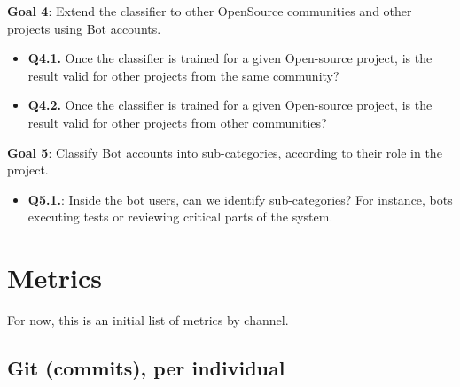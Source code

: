 \documentclass[a4paper, 12pt]{book}
\begin{document}
\textbf{Goal 4}: Extend the classifier to other OpenSource communities and other projects using Bot accounts.

\begin{itemize}
    \item \textbf{Q4.1.} Once the classifier is trained for a given Open-source project, is the result valid for other projects from the same community?
    \item \textbf{Q4.2.} Once the classifier is trained for a given Open-source project, is the result valid for other projects from other communities?
\end{itemize}

\textbf{Goal 5}: Classify Bot accounts into sub-categories, according to their role in the project.

\begin{itemize}
    \item \textbf{Q5.1.}: Inside the bot users, can we identify sub-categories? For instance, bots executing tests or reviewing critical parts of the system.
\end{itemize}

\section{Metrics}
For now, this is an initial list of metrics by channel.

\subsection{Git (commits), per individual}
\end{document}
